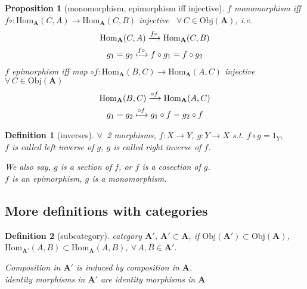 \documentclass[10pt]{amsart}
\newtheorem{proposition}{Proposition}
\newtheorem{definition}{Definition}
\begin{document}
\begin{multicols*}{2}
\begin{proposition}[monomorphism, epimorphism iff injective]
	$f$ monomorphism iff $f \circ : \text{Hom}_{\mathbf{A}}(C,A) \to \text{Hom}_{\mathbf{A}}(C,B)$ injective \, $\forall \, C \in \text{Obj}(\mathbf{A})$, i.e.
	\begin{equation}
	\begin{gathered}
	\text{Hom}_{\mathbf{A}}(C, A) \xrightarrow{f \circ } \text{Hom}_{\mathbf{A}}(C,B) \\
 g_1 = g_2 \xmapsto{f \circ} f\circ g_1 = f\circ g_2
\end{gathered}
	\end{equation}
$f$ epimorphism iff map $\circ f : \text{Hom}_{\mathbf{A}}(B,C) \to \text{Hom}_{\mathbf{A}}(A,C)$ injective $\forall \, C \in \text{Obj}(\mathbf{A})$
\begin{equation}
\begin{gathered}
\text{Hom}_{\mathbf{A}}(B, C) \xrightarrow{\circ f} \text{Hom}_{\mathbf{A}}(A,C) \\
g_1 = g_2  \xmapsto{ \circ f} g_1\circ f = g_2 \circ f
\end{gathered}
\end{equation}
\end{proposition}

\begin{definition}[inverses]
	$\forall \, $ 2 morphisms, $f:X\to Y$, $g: Y \to X$ s.t. $f\circ g= 1_Y$,\\
	$f$ is called left inverse of $g$, $g$ is called right inverse of $f$.
	
	We also say, $g$ is a section of $f$, or $f$ is a cosection of $g$. \\
	$f$ is an epimorphism, $g$ is a monomorphism.
\end{definition}

\subsection{More definitions with categories}

\begin{definition}[subcategory]
category $\mathbf{A}'$, $\mathbf{A}' \subset \mathbf{A}$, if $\text{Obj}(\mathbf{A}') \subset \text{Obj}(\mathbf{A})$, $\text{Hom}_{\mathbf{A}'}(A,B) \subset \text{Hom}_{\mathbf{A}}(A,B)$, $\forall \, A, B \in \mathbf{A}'$.

Composition in $\mathbf{A}'$ is induced by composition in $\mathbf{A}$.\\
identity morphisms in $\mathbf{A}'$ are identity morphisms in $\mathbf{A}$
\end{definition}


\end{multicols*}
\end{document}
